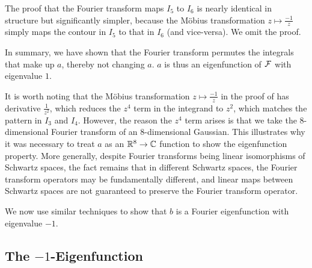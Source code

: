 The proof that the Fourier transform maps $I_5$ to $I_6$ is nearly identical in structure but significantly simpler, because the Möbius transformation $z \mapsto \frac{-1}{z}$ simply maps the contour in $I_5$ to that in $I_6$ (and vice-versa). We omit the proof.

In summary, we have shown that the Fourier transform permutes the integrals that make up $a$, thereby not changing $a$. $a$ is thus an eigenfunction of $\mathcal{F}$ with eigenvalue $1$.

It is worth noting that the Möbius transformation $z \mapsto \frac{-1}{z}$ in the proof of  has derivative $\frac{1}{z^2}$, which reduces the $z^4$ term in the integrand to $z^2$, which matches the pattern in $I_3$ and $I_4$. However, the reason the $z^4$ term arises is that we take the $8$-dimensional Fourier transform of an $8$-dimensional Gaussian. This illustrates why it was necessary to treat $a$ as an $\mathbb{R}^8 \to \mathbb{C}$ function to show the eigenfunction property. More generally, despite Fourier transforms being linear isomorphisms of Schwartz spaces, the fact remains that in different Schwartz spaces, the Fourier transform operators may be fundamentally different, and linear maps between Schwartz spaces are not guaranteed to preserve the Fourier transform operator.

We now use similar techniques to show that $b$ is a Fourier eigenfunction with eigenvalue $-1$. %

\subsection{The $-1$-Eigenfunction}